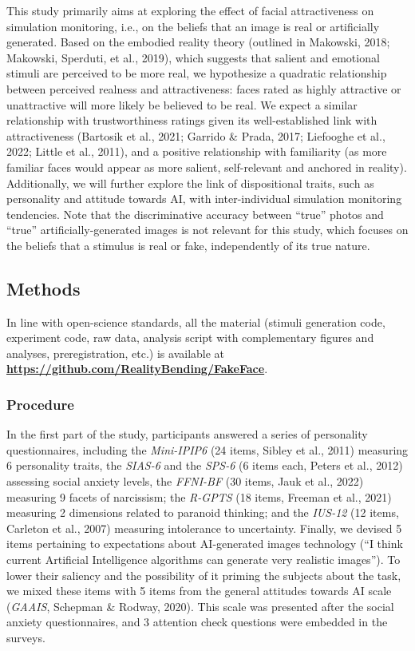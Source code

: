 \documentclass[
  man,floatsintext]{apa6}
\begin{document}
This study primarily aims at exploring the effect of facial attractiveness on simulation monitoring, i.e., on the beliefs that an image is real or artificially generated. Based on the embodied reality theory (outlined in Makowski, 2018; Makowski, Sperduti, et al., 2019), which suggests that salient and emotional stimuli are perceived to be more real, we hypothesize a quadratic relationship between perceived realness and attractiveness: faces rated as highly attractive or unattractive will more likely be believed to be real. We expect a similar relationship with trustworthiness ratings given its well-established link with attractiveness (Bartosik et al., 2021; Garrido \& Prada, 2017; Liefooghe et al., 2022; Little et al., 2011), and a positive relationship with familiarity (as more familiar faces would appear as more salient, self-relevant and anchored in reality). Additionally, we will further explore the link of dispositional traits, such as personality and attitude towards AI, with inter-individual simulation monitoring tendencies. Note that the discriminative accuracy between ``true'' photos and ``true'' artificially-generated images is not relevant for this study, which focuses on the beliefs that a stimulus is real or fake, independently of its true nature.

\hypertarget{methods}{%
\subsection{Methods}\label{methods}}

In line with open-science standards, all the material (stimuli generation code, experiment code, raw data, analysis script with complementary figures and analyses, preregistration, etc.) is available at \href{https://github.com/RealityBending/FakeFace}{\textbf{https://github.com/RealityBending/FakeFace}}.

\hypertarget{procedure}{%
\subsubsection{Procedure}\label{procedure}}

In the first part of the study, participants answered a series of personality questionnaires, including the \emph{Mini-IPIP6} (24 items, Sibley et al., 2011) measuring 6 personality traits, the \emph{SIAS-6} and the \emph{SPS-6} (6 items each, Peters et al., 2012) assessing social anxiety levels, the \emph{FFNI-BF} (30 items, Jauk et al., 2022) measuring 9 facets of narcissism; the \emph{R-GPTS} (18 items, Freeman et al., 2021) measuring 2 dimensions related to paranoid thinking; and the \emph{IUS-12} (12 items, Carleton et al., 2007) measuring intolerance to uncertainty. Finally, we devised 5 items pertaining to expectations about AI-generated images technology (``I think current Artificial Intelligence algorithms can generate very realistic images''). To lower their saliency and the possibility of it priming the subjects about the task, we mixed these items with 5 items from the general attitudes towards AI scale (\emph{GAAIS}, Schepman \& Rodway, 2020). This scale was presented after the social anxiety questionnaires, and 3 attention check questions were embedded in the surveys.
\end{document}
